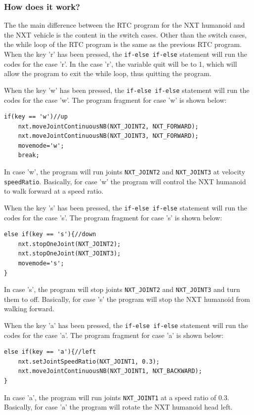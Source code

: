 \documentclass[11pt]{article}
\begin{document}
\subsubsection*{How does it work?}
The the main difference between the RTC program for the NXT humanoid and the NXT vehicle is the content 
in the switch cases. Other than the switch cases, the while loop of the RTC program is the same as the 
previous RTC program. When the key 'r' has been pressed, the \verb+if-else if-else+ statement will run the codes 
for the case 'r'. In the case 'r', the variable quit will be to 1, which will allow the program to exit 
the while loop, thus quitting the program.\\
\newline

When the key 'w' has been pressed, the \verb+if-else if-else+ statement will run the codes for the case 'w'.
The program fragment for case 'w' is shown below:

\begin{verbatim} 
if(key == 'w')//up
    nxt.moveJointContinuousNB(NXT_JOINT2, NXT_FORWARD);
    nxt.moveJointContinuousNB(NXT_JOINT3, NXT_FORWARD);
    movemode='w';
    break;
\end{verbatim}
In case 'w', the program will run joints \verb+NXT_JOINT2+ and \verb+NXT_JOINT3+ at velocity \verb+speedRatio+. 
Basically, for case 'w' the program will control the NXT humanoid to walk forward at a speed ratio.\\
\newline

When the key 's' has been pressed, the \verb+if-else if-else+ statement will run the codes for the case 's'.
The program fragment for case 's' is shown below:

\begin{verbatim} 
else if(key == 's'){//down
    nxt.stopOneJoint(NXT_JOINT2);
    nxt.stopOneJoint(NXT_JOINT3);
    movemode='s';
}
\end{verbatim}
In case 's', the program will stop joints \verb+NXT_JOINT2+ and \verb+NXT_JOINT3+ and turn them to off.
Basically, for case 's' the program will stop the NXT humanoid from walking forward.\\
\newline

When the key 'a' has been pressed, the \verb+if-else if-else+ statement will run the codes for the case 'a'.
The program fragment for case 'a' is shown below:
\begin{verbatim} 
else if(key == 'a'){//left
    nxt.setJointSpeedRatio(NXT_JOINT1, 0.3);
    nxt.moveJointContinuousNB(NXT_JOINT1, NXT_BACKWARD);
}
\end{verbatim}
In case 'a', the program will run joints \verb+NXT_JOINT1+ at a speed ratio of 0.3.
Basically, for case 'a' the program will rotate the NXT humanoid head left.\\
\newline
\end{document}
